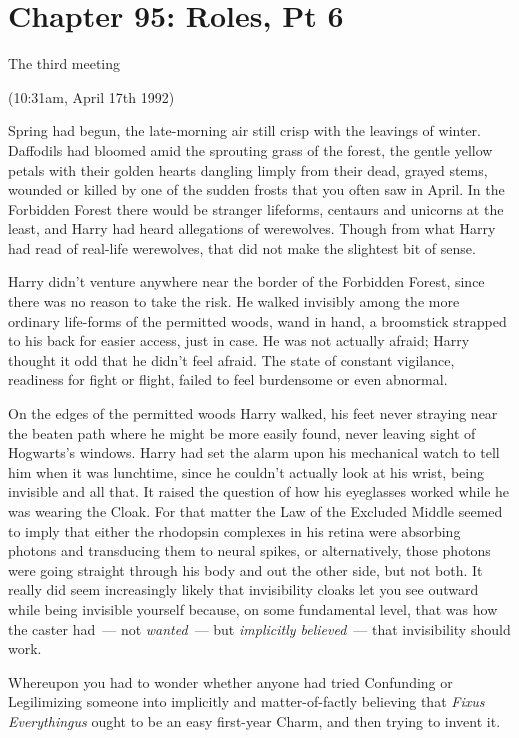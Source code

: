\chapter{Chapter 95: Roles, Pt 6}
The third meeting

(10:31am, April 17th 1992)

Spring had begun, the late-morning air still crisp with the leavings of winter. Daffodils had bloomed amid the sprouting grass of the forest, the gentle yellow petals with their golden hearts dangling limply from their dead, grayed stems, wounded or killed by one of the sudden frosts that you often saw in April. In the Forbidden Forest there would be stranger lifeforms, centaurs and unicorns at the least, and Harry had heard allegations of werewolves. Though from what Harry had read of real-life werewolves, that did not make the slightest bit of sense.

Harry didn't venture anywhere near the border of the Forbidden Forest, since there was no reason to take the risk. He walked invisibly among the more ordinary life-forms of the permitted woods, wand in hand, a broomstick strapped to his back for easier access, just in case. He was not actually afraid; Harry thought it odd that he didn't feel afraid. The state of constant vigilance, readiness for fight or flight, failed to feel burdensome or even abnormal.

On the edges of the permitted woods Harry walked, his feet never straying near the beaten path where he might be more easily found, never leaving sight of Hogwarts's windows. Harry had set the alarm upon his mechanical watch to tell him when it was lunchtime, since he couldn't actually look at his wrist, being invisible and all that. It raised the question of how his eyeglasses worked while he was wearing the Cloak. For that matter the Law of the Excluded Middle seemed to imply that either the rhodopsin complexes in his retina were absorbing photons and transducing them to neural spikes, or alternatively, those photons were going straight through his body and out the other side, but not both. It really did seem increasingly likely that invisibility cloaks let you see outward while being invisible yourself because, on some fundamental level, that was how the caster had~--- not \emph{wanted}~--- but \emph{implicitly believed}~--- that invisibility should work.

Whereupon you had to wonder whether anyone had tried Confunding or Legilimizing someone into implicitly and matter-of-factly believing that \emph{Fixus Everythingus} ought to be an easy first-year Charm, and then trying to invent it.


